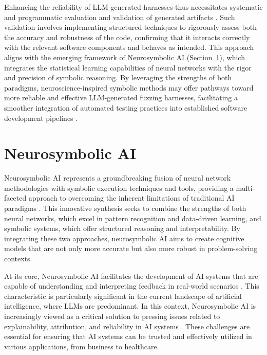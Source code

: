 \documentclass[
  a4paper,
]{scrreprt}
\theoremstyle{definition}
\theoremstyle{remark}
\begin{document}
Enhancing the reliability of LLM-generated harnesses thus necessitates
systematic and programmatic evaluation and validation of generated
artifacts \autocite{tilwani2024}. Such validation involves implementing
structured techniques to rigorously assess both the accuracy and
robustness of the code, confirming that it interacts correctly with the
relevant software components and behaves as intended. This approach
aligns with the emerging framework of Neurosymbolic AI
(Section~\ref{sec-nesy}), which integrates the statistical learning
capabilities of neural networks with the rigor and precision of symbolic
reasoning. By leveraging the strengths of both paradigms,
neuroscience-inspired symbolic methods \autocite{kahneman2011} may offer
pathways toward more reliable and effective LLM-generated fuzzing
harnesses, facilitating a smoother integration of automated testing
practices into established software development pipelines
\autocite{mastropaolo2025,velasco2025}.

\section{Neurosymbolic AI}\label{sec-nesy}

Neurosymbolic AI represents a groundbreaking fusion of neural network
methodologies with symbolic execution techniques and tools, providing a
multi-faceted approach to overcoming the inherent limitations of
traditional AI paradigms \autocite{sheth2023,garcez2020}. This
innovative synthesis seeks to combine the strengths of both neural
networks, which excel in pattern recognition and data-driven learning,
and symbolic systems, which offer structured reasoning and
interpretability. By integrating these two approaches, neurosymbolic AI
aims to create cognitive models that are not only more accurate but also
more robust in problem-solving contexts.

At its core, Neurosymbolic AI facilitates the development of AI systems
that are capable of understanding and interpreting feedback in
real-world scenarios \autocite{ganguly2024}. This characteristic is
particularly significant in the current landscape of artificial
intelligence, where LLMs are predominant. In this context, Neurosymbolic
AI is increasingly viewed as a critical solution to pressing issues
related to explainability, attribution, and reliability in AI systems
\autocite{gaur2023,tilwani2024}. These challenges are essential for
ensuring that AI systems can be trusted and effectively utilized in
various applications, from business to healthcare.
\end{document}
